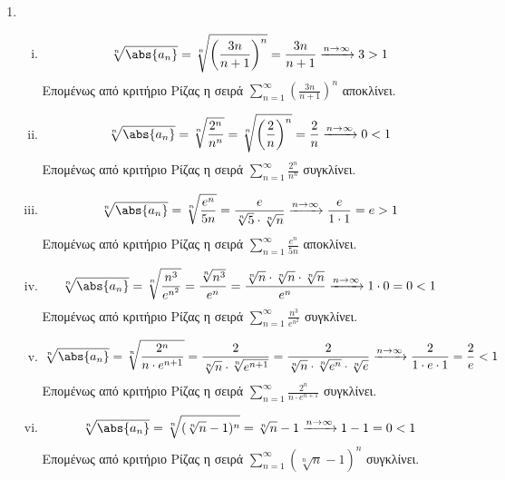 \documentclass[a4paper,table]{report}
\begin{document}
\begin{enumerate}
  \item 
    \begin{enumerate}[i)]
      \item 
        \[
          \sqrt[n]{\abs{a_{n}}} = \sqrt[n]{\left(\frac{3n}{n+1} \right)^{n}} = 
          \frac{3n}{n+1}\xrightarrow{n \to \infty} 3 > 1 
        \]
        Επομένως από κριτήριο Ρίζας η σειρά $ \sum_{n=1}^{\infty} 
        \left(\frac{3n}{n+1}\right)^{n} $ αποκλίνει.

      \item 
        \[
          \sqrt[n]{\abs{a_{n}}} = \sqrt[n]{\frac{2^{n}}{n^{n}}} = 
          \sqrt[n]{\left(\frac{2}{n} \right)^{n}} = \frac{2}{n} 
          \xrightarrow{n \to \infty} 0 < 1
        \] 
        Επομένως από κριτήριο Ρίζας η σειρά $ \sum_{n=1}^{\infty} 
        \frac{2^{n}}{n^{n}} $ συγκλίνει.

      \item 
        \[
          \sqrt[n]{\abs{a_{n}}} = \sqrt[n]{\frac{e^{n}}{5n}} = 
          \frac{e}{\sqrt[n]{5} \cdot \sqrt[n]{n}} \xrightarrow{n \to \infty} 
          \frac{e}{1 \cdot 1} = e>1
        \] 
        Επομένως από κριτήριο Ρίζας η σειρά 
        $ \sum_{n=1}^{\infty} \frac{e^{n}}{5n} $ αποκλίνει.

      \item 
        \[
          \sqrt[n]{\abs{a_{n}}} = \sqrt[n]{\frac{n^{3}}{e^{n^{2}}}} = 
          \frac{\sqrt[n]{n^{3}} }{e^{n}} = \frac{\sqrt[n]{n} \cdot 
          \sqrt[n]{n} \cdot \sqrt[n]{n}}{e^{n}} \xrightarrow{n \to \infty} 
          1\cdot 0 = 0 <1
        \] 
        Επομένως από κριτήριο Ρίζας η σειρά 
        $ \sum_{n=1}^{\infty} \frac{n^{3}}{e^{n^{2}}} $ συγκλίνει.

      \item 
        \[
          \sqrt[n]{\abs{a_{n}}} = \sqrt[n]{\frac{2^{n}}{n\cdot e^{n+1}}} = 
          \frac{2}{\sqrt[n]{n} \cdot \sqrt[n]{e^{n+1}}} = 
          \frac{2}{\sqrt[n]{n} \cdot \sqrt[n]{e^{n}}\cdot \sqrt[n]{e}}
          \xrightarrow{n \to \infty} \frac{2}{1 \cdot e \cdot 1} = 
          \frac{2}{e} <1
        \] 
        Επομένως από κριτήριο Ρίζας η σειρά 
        $ \sum_{n=1}^{\infty} \frac{2^{n}}{n \cdot e^{n+1}} $ συγκλίνει.

      \item 
        \[
          \sqrt[n]{\abs{a_{n}}} = \sqrt[n]{(\sqrt[n]{n} -1)^{n}} = 
          \sqrt[n]{n} - 1 \xrightarrow{n \to \infty} 1-1=0 <1
        \]
        Επομένως από κριτήριο Ρίζας η σειρά 
        $ \sum_{n=1}^{\infty} (\sqrt[n]{n} -1)^{n} $ συγκλίνει.


\end{enumerate}
\end{enumerate}
\end{document}
